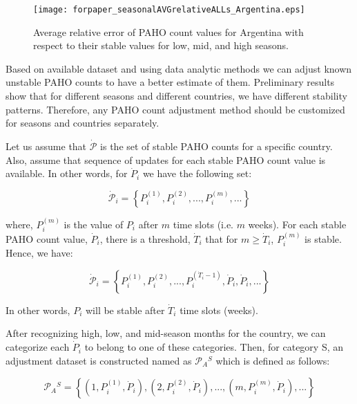 \begin{figure}[h]
  \centering
    \texttt{[image: forpaper\_seasonalAVGrelativeALLs\_Argentina.eps]}
  \caption{Average relative error of PAHO count values for Argentina with respect to their stable values for low, mid, and high seasons.}
  \label{fig:seasonal_relerrors}
\end{figure}  


Based on available dataset and using data analytic methods we can adjust known unstable PAHO counts to have a better estimate of them. Preliminary results show that for different seasons and different countries, we have different stability patterns. Therefore, any PAHO count adjustment method should be customized for seasons and countries separately. 

Let us assume that $\dot{\mathcal{P}}$ is the set of stable PAHO counts for a specific country. Also, assume that sequence of updates for each stable PAHO count value is available. In other words, for $\dot{P}_i$ we have the following set:
 
\begin{equation}
\dot{\mathcal{P}}_i = \left \{P_i^{(1)},P_i^{(2)},...,P_i^{(m)},...  \right \}
\end{equation}

where, $P_i^{(m)}$ is the value of $P_i$ after $m$ time slots (i.e. $m$ weeks). For each stable PAHO count value, $\dot{P}_i$, there is a threshold, $\dot{T}_i$ that for $m \ge \dot{T}_i$, $P_i^{(m)}$ is stable. Hence, we have:

\begin{equation}
\dot{\mathcal{P}}_i = \left \{P_i^{(1)},P_i^{(2)},...,P_i^{(\dot{T}_i-1)},\dot{P}_i,\dot{P}_i,...  \right \}
\end{equation}

In other words, $P_i$ will be stable after $\dot{T}_i$ time slots (weeks). 

After recognizing high, low, and mid-season months for the country, we can categorize each $\dot{P}_i$ to belong to one of these categories. Then, for category S, an adjustment dataset is constructed named as $\mathcal{P}_A{^S}$ which is defined as follows:

\begin{equation}
\mathcal{P}_A{^S} = \left \{ (1,P_i^{(1)},\dot{P}_i),(2,P_i^{(2)},\dot{P}_i),...,(m,P_i^{(m)},\dot{P}_i), ...  \right \}
\end{equation}

